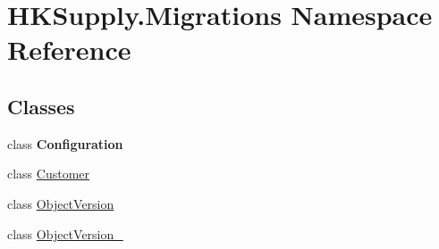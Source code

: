 \hypertarget{namespace_h_k_supply_1_1_migrations}{}\section{H\+K\+Supply.\+Migrations Namespace Reference}
\label{namespace_h_k_supply_1_1_migrations}
\subsection*{Classes}
\begin{DoxyCompactItemize}
\item 
class {\bfseries Configuration}
\item 
class \hyperlink{class_h_k_supply_1_1_migrations_1_1_customer}{Customer}
\item 
class \hyperlink{class_h_k_supply_1_1_migrations_1_1_object_version}{Object\+Version}
\item 
class \hyperlink{class_h_k_supply_1_1_migrations_1_1_object_version__2}{Object\+Version\+\_}
\end{DoxyCompactItemize}
